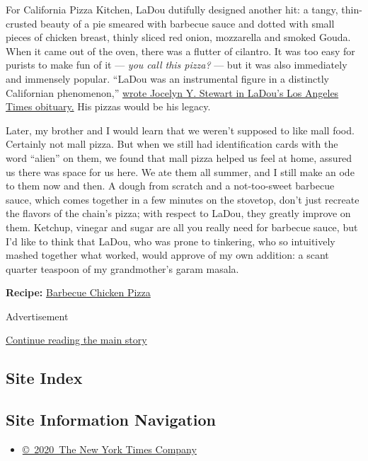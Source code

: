 For California Pizza Kitchen, LaDou dutifully designed another hit: a
tangy, thin-crusted beauty of a pie smeared with barbecue sauce and
dotted with small pieces of chicken breast, thinly sliced red onion,
mozzarella and smoked Gouda. When it came out of the oven, there was a
flutter of cilantro. It was too easy for purists to make fun of it ---
\emph{you call this pizza?} --- but it was also immediately and
immensely popular. ``LaDou was an instrumental figure in a distinctly
Californian phenomenon,''
\href{http://articles.latimes.com/2008/jan/04/local/me-ladou4}{wrote
Jocelyn Y. Stewart in LaDou's Los Angeles Times obituary.} His pizzas
would be his legacy.

Later, my brother and I would learn that we weren't supposed to like
mall food. Certainly not mall pizza. But when we still had
identification cards with the word ``alien'' on them, we found that mall
pizza helped us feel at home, assured us there was space for us here. We
ate them all summer, and I still make an ode to them now and then. A
dough from scratch and a not-too-sweet barbecue sauce, which comes
together in a few minutes on the stovetop, don't just recreate the
flavors of the chain's pizza; with respect to LaDou, they greatly
improve on them. Ketchup, vinegar and sugar are all you really need for
barbecue sauce, but I'd like to think that LaDou, who was prone to
tinkering, who so intuitively mashed together what worked, would approve
of my own addition: a scant quarter teaspoon of my grandmother's garam
masala.

\textbf{Recipe:}
\href{https://cooking.nytimes3xbfgragh.onion/recipes/1019887-barbecue-chicken-pizza}{Barbecue
Chicken Pizza}

Advertisement

\protect\hyperlink{after-bottom}{Continue reading the main story}

\hypertarget{site-index}{%
\subsection{Site Index}\label{site-index}}

\hypertarget{site-information-navigation}{%
\subsection{Site Information
Navigation}\label{site-information-navigation}}

\begin{itemize}
\tightlist
\item
  \href{https://help.nytimes3xbfgragh.onion/hc/en-us/articles/115014792127-Copyright-notice}{©~2020~The
  New York Times Company}
\end{itemize}

